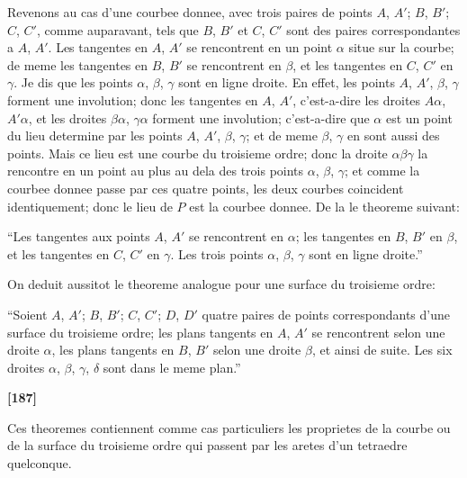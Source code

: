 \documentclass[11pt,a4paper]{article}
\begin{document}
Revenons au cas d'une courbee donnee, avec trois paires de points $A$, $A'$; $B$, $B'$; $C$, $C'$,
comme auparavant, tels que $B$, $B'$ et $C$, $C'$ sont des paires correspondantes a $A$, $A'$. Les
tangentes en $A$, $A'$ se rencontrent en un point $\alpha$ situe sur la courbe; de meme les
tangentes en $B$, $B'$ se rencontrent en $\beta$, et les tangentes en $C$, $C'$ en $\gamma$. Je dis que les
points $\alpha$, $\beta$, $\gamma$ sont en ligne droite. En effet, les points $A$, $A'$, $\beta$, $\gamma$ forment une involution;
donc les tangentes en $A$, $A'$, c'est-a-dire les droites $A\alpha$, $A'\alpha$, et les droites $\beta\alpha$, $\gamma\alpha$
forment une involution; c'est-a-dire que $\alpha$ est un point du lieu determine par les points
$A$, $A'$, $\beta$, $\gamma$; et de meme $\beta$, $\gamma$ en sont aussi des points. Mais ce lieu est une courbe du
troisieme ordre; donc la droite $\alpha\beta\gamma$ la rencontre en un point au plus au dela des trois
points $\alpha$, $\beta$, $\gamma$; et comme la courbee donnee passe par ces quatre points, les deux courbes
coincident identiquement; donc le lieu de $P$ est la courbee donnee. De la le theoreme
suivant:

``Les tangentes aux points $A$, $A'$ se rencontrent en $\alpha$; les tangentes en $B$, $B'$ en $\beta$,
et les tangentes en $C$, $C'$ en $\gamma$. Les trois points $\alpha$, $\beta$, $\gamma$ sont en ligne droite.''

On deduit aussitot le theoreme analogue pour une surface du troisieme ordre:

``Soient $A$, $A'$; $B$, $B'$; $C$, $C'$; $D$, $D'$ quatre paires de points correspondants d'une
surface du troisieme ordre; les plans tangents en $A$, $A'$ se rencontrent selon une droite
$\alpha$, les plans tangents en $B$, $B'$ selon une droite $\beta$, et ainsi de suite. Les six droites
$\alpha$, $\beta$, $\gamma$, $\delta$ sont dans le meme plan.''

\textbf{[187]}

Ces theoremes contiennent comme cas particuliers les proprietes de la courbe ou de
la surface du troisieme ordre qui passent par les aretes d'un tetraedre quelconque.
\end{document}
